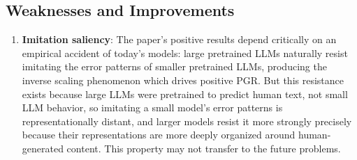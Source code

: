 \documentclass{article}
\begin{document}
\begin{enumerate}[leftmargin=*]
\section{Weaknesses and Improvements}

\begin{enumerate}[leftmargin=*]

 \item \textbf{Imitation saliency}: The paper's positive results depend critically on an empirical accident of today's models: large pretrained LLMs naturally resist imitating the error patterns of smaller pretrained LLMs, producing the inverse scaling phenomenon which drives positive PGR. But this resistance exists because large LLMs were pretrained to predict human text, not small LLM behavior, so imitating a small model's error patterns is representationally distant, and larger models resist it more strongly precisely because their representations are more deeply organized around human-generated content. This property may not transfer to the future problems.



\end{enumerate}
\end{enumerate}
\end{document}
